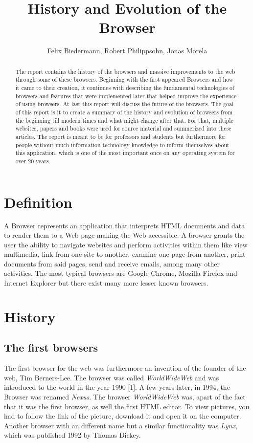 \documentclass[runningheads]{llncs}
\title{History and Evolution of the Browser}
\author{Felix Biedermann, Robert Philippsohn, Jonas Morela}
\institute{University of Stuttgart, Institute for Architecture of Application Systems \\
Universitätsstraße 38, 70569 Stuttgart, Germany}
\begin{document}
\raggedbottom
\maketitle

	\begin{abstract}
			The report contains the history of the browsers and massive improvements to the web through some of these browsers. Beginning with the first appeared Browsers and how it came to their creation, it continues with describing the fundamental technologies of browsers and features that were implemented later that helped improve the experience of using browsers. At last this report will discuss the future of the browsers. The
			goal of this report is it to create a summary of the history and evolution of browsers from the beginning till modern times and what might change after that. For that, multiple websites, papers and books were used for source material and summerized into these articles. The report is meant to be for professors and students but furthermore for people without much information technology knowledge to inform themselves about this application, which is one of the most important once on any operating system for over 20 years.
	\end{abstract}

	\section{Definition}
		A Browser represents an application that interprets HTML documents and data to render them to a Web page making the Web accessible. A browser grants the user the ability to navigate websites and perform activities within them like view multimedia, link from one site to another, examine one page from another, print documents from said pages, send and receive emails, among many other activities. The most typical browsers are Google Chrome, Mozilla Firefox and Internet Explorer but there exist many more lesser known browsers.
	\section{History}
		\subsection{The first browsers}
		The first browser for the web was furthermore an invention of the founder of the web, Tim Berners-Lee. The browser was called \textit{WorldWideWeb} and was introduced to the world in the year 1990 [1]. A few years later, in 1994, the Browser was renamed \textit{Nexus}. The browser \textit{WorldWideWeb} was, apart of the fact that it was the first browser, as well the first HTML editor.
		To view pictures, you had to follow the link of the picture, download it and open it on the computer. Another browser with an different name but a similar functionality was \textit{Lynx}, which was published 1992 by Thomas Dickey.
\end{document}
